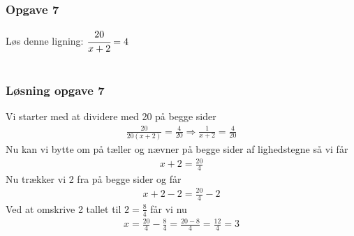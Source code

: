 \subsubsection*{Opgave 7}

Løs denne ligning: $\cfrac{20}{x+2} = 4$\\\\

\subsubsection*{Løsning opgave 7}
Vi starter med at dividere med 20 på begge sider
\begin{align*}
    \frac{20}{20(x+2)}=\frac{4}{20} \Longrightarrow \frac{1}{x+2} = \frac{4}{20}
\end{align*}
Nu kan vi bytte om på tæller og nævner på begge sider af lighedstegne så vi får
\begin{align*}
    x+2 = \frac{20}{4}
\end{align*}
Nu trækker vi 2 fra på begge sider og får
\begin{align*}
    x + 2 - 2 = \frac{20}{4}- 2
\end{align*}
Ved at omskrive 2 tallet til $2 = \frac{8}{4}$ får vi nu
\begin{align*}
    x = \frac{20}{4}-\frac{8}{4}=\frac{20-8}{4}=\frac{12}{4}=3
\end{align*}